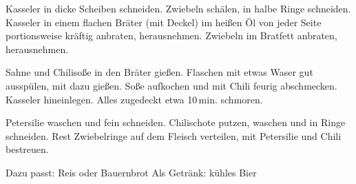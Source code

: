 \begin{Notes}
\item Kasseler in dicke Scheiben schneiden. Zwiebeln schälen, in halbe Ringe schneiden. Kasseler in einem flachen Bräter (mit Deckel) im heißen Öl von jeder Seite portionsweise kräftig anbraten, herausnehmen. Zwiebeln im Bratfett anbraten, herausnehmen.
\item Sahne und Chilisoße in den Bräter gießen. Flaschen mit etwas Waser gut ausspülen, mit dazu gießen. Soße aufkochen und mit Chili feurig abschmecken. Kasseler hineinlegen. Alles zugedeckt etwa 10\,min. schmoren.
\item Petersilie waschen und fein schneiden. Chilischote putzen, waschen und in Ringe schneiden. Rest Zwiebelringe auf dem Fleisch verteilen, mit Petersilie und Chili bestreuen.
\end{Notes}
Dazu passt: Reis oder Bauernbrot
Als Getränk: kühles Bier

